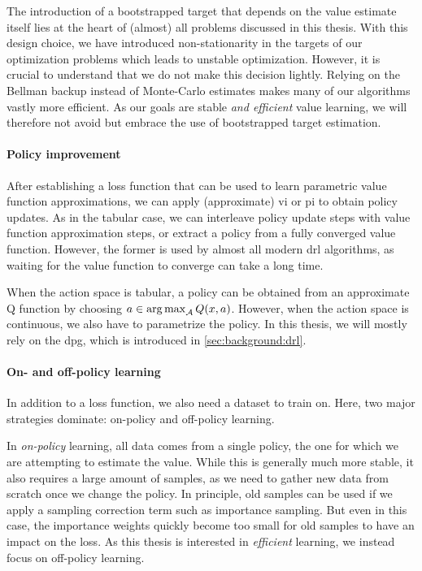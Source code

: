 The introduction of a bootstrapped target that depends on the value estimate itself lies at the heart of (almost) all problems discussed in this thesis.
With this design choice, we have introduced non-stationarity in the targets of our optimization problems which leads to unstable optimization.
However, it is crucial to understand that we do not make this decision lightly.
Relying on the Bellman backup instead of Monte-Carlo estimates makes many of our algorithms vastly more efficient.
As our goals are stable \emph{and efficient} value learning, we will therefore not avoid but embrace the use of bootstrapped target estimation.

\paragraph{Policy improvement}

After establishing a loss function that can be used to learn parametric value function approximations, we can apply (approximate) \ac{vi} or \ac{pi} to obtain policy updates.
As in the tabular case, we can interleave policy update steps with value function approximation steps, or extract a policy from a fully converged value function.
However, the former is used by almost all modern \ac{drl} algorithms, as waiting for the value function to converge can take a long time.

When the action space is tabular, a policy can be obtained from an approximate Q function by choosing $a \in \operatorname*{arg\,max}_{\mathcal{A}} Q(x,a)$.
However, when the action space is continuous, we also have to parametrize the policy.
In this thesis, we will mostly rely on the \ac{dpg}, which is introduced in \autoref{sec:background:drl}.

\paragraph{On- and off-policy learning}

In addition to a loss function, we also need a dataset to train on.
Here, two major strategies dominate: on-policy and off-policy learning.

In \emph{on-policy} learning, all data comes from a single policy, the one for which we are attempting to estimate the value.
While this is generally much more stable, it also requires a large amount of samples, as we need to gather new data from scratch once we change the policy.
In principle, old samples can be used if we apply a sampling correction term such as importance sampling.
But even in this case, the importance weights quickly become too small for old samples to have an impact on the loss.
As this thesis is interested in \emph{efficient} learning, we instead focus on off-policy learning.

